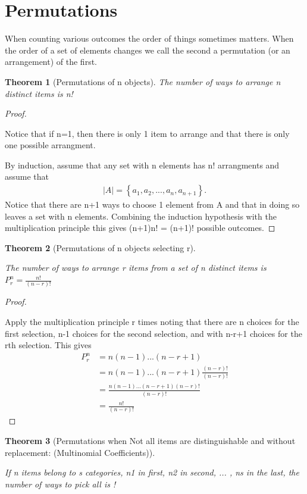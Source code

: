 \documentclass[10pt,]{book}
\theoremstyle{plain}
\newtheorem{theorem}{Theorem}[section]
\theoremstyle{definition}
\theoremstyle{definition}
\numberwithin{equation}{section}
\begin{document}
\section[Permutations]{Permutations}\label{section-14}
When counting various outcomes the order of things sometimes matters. When the order of a set of elements changes we call the second a permutation (or an arrangement) of the first.%
\begin{theorem}[Permutations of n objects]\label{theorem-10}
The number of ways to arrange n distinct items is n!\end{theorem}
\begin{proof}\hypertarget{proof-7}{}
Notice that if n=1, then there is only 1 item to arrange and 
			that there is only one possible arrangment.%
\par

			By induction, assume that any set with n elements has n! arrangments 
			and assume that 
			\begin{gather*}
|A| = \left \{ a_1, a_2, ... , a_n, a_{n+1} \right \}.
\end{gather*}
			Notice that there are n+1 ways to choose 1 element from A and that in doing so leaves a set with n elements. Combining the induction hypothesis with the multiplication principle this gives (n+1)n! = (n+1)! possible outcomes.
\end{proof}
\begin{theorem}[Permutations of n objects selecting r]\label{theorem-11}

			The number of ways to arrange r items from a set of n distinct items 
			is \( P_r^n = \frac{n!}{(n-r)!} \)
\end{theorem}
\begin{proof}\hypertarget{proof-8}{}

			Apply the multiplication principle r times noting that there are 
			n choices for the first selection, n-1 choices for the second
			selection, and with n-r+1 choices for the rth selection. This gives
			\begin{align*}
P_r^n & = n(n-1) ... (n-r+1)\\
& = n(n-1) ... (n-r+1)\frac{(n-r)!}{(n-r)!}\\
& = \frac{n(n-1) ... (n-r+1)(n-r)!}{(n-r)!}\\
& = \frac{n!}{(n-r)!}
\end{align*}
\end{proof}
\begin{theorem}[Permutations when Not all items are distinguishable and without replacement: (Multinomial Coefficients)]\label{theorem-12}

If n items belong to s categories, n1 in first, n2 in second, ... , ns in the last, the number of ways to pick all is
!	
	\end{theorem}
\typeout{************************************************}
\typeout{************************************************}
\end{document}
